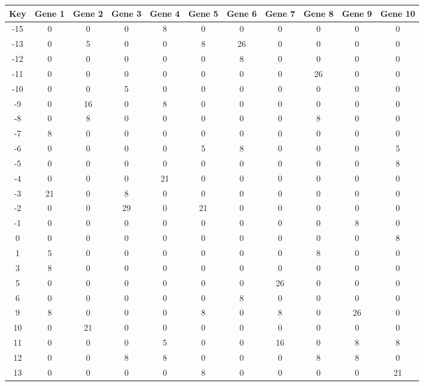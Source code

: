 \begin{tabular}{|c|c|c|c|c|c|c|c|c|c|c|}
\hline
Key & Gene 1 & Gene 2 & Gene 3 & Gene 4 & Gene 5 & Gene 6 & Gene 7 & Gene 8 & Gene 9 & Gene 10 \\
\hline
-15 & 0 & 0 & 0 & 8 & 0 & 0 & 0 & 0 & 0 & 0 \\
-13 & 0 & 5 & 0 & 0 & 8 & 26 & 0 & 0 & 0 & 0 \\
-12 & 0 & 0 & 0 & 0 & 0 & 8 & 0 & 0 & 0 & 0 \\
-11 & 0 & 0 & 0 & 0 & 0 & 0 & 0 & 26 & 0 & 0 \\
-10 & 0 & 0 & 5 & 0 & 0 & 0 & 0 & 0 & 0 & 0 \\
-9 & 0 & 16 & 0 & 8 & 0 & 0 & 0 & 0 & 0 & 0 \\
-8 & 0 & 8 & 0 & 0 & 0 & 0 & 0 & 8 & 0 & 0 \\
-7 & 8 & 0 & 0 & 0 & 0 & 0 & 0 & 0 & 0 & 0 \\
-6 & 0 & 0 & 0 & 0 & 5 & 8 & 0 & 0 & 0 & 5 \\
-5 & 0 & 0 & 0 & 0 & 0 & 0 & 0 & 0 & 0 & 8 \\
-4 & 0 & 0 & 0 & 21 & 0 & 0 & 0 & 0 & 0 & 0 \\
-3 & 21 & 0 & 8 & 0 & 0 & 0 & 0 & 0 & 0 & 0 \\
-2 & 0 & 0 & 29 & 0 & 21 & 0 & 0 & 0 & 0 & 0 \\
-1 & 0 & 0 & 0 & 0 & 0 & 0 & 0 & 0 & 8 & 0 \\
0 & 0 & 0 & 0 & 0 & 0 & 0 & 0 & 0 & 0 & 8 \\
1 & 5 & 0 & 0 & 0 & 0 & 0 & 0 & 8 & 0 & 0 \\
3 & 8 & 0 & 0 & 0 & 0 & 0 & 0 & 0 & 0 & 0 \\
5 & 0 & 0 & 0 & 0 & 0 & 0 & 26 & 0 & 0 & 0 \\
6 & 0 & 0 & 0 & 0 & 0 & 8 & 0 & 0 & 0 & 0 \\
9 & 8 & 0 & 0 & 0 & 8 & 0 & 8 & 0 & 26 & 0 \\
10 & 0 & 21 & 0 & 0 & 0 & 0 & 0 & 0 & 0 & 0 \\
11 & 0 & 0 & 0 & 5 & 0 & 0 & 16 & 0 & 8 & 8 \\
12 & 0 & 0 & 8 & 8 & 0 & 0 & 0 & 8 & 8 & 0 \\
13 & 0 & 0 & 0 & 0 & 8 & 0 & 0 & 0 & 0 & 21 \\
\hline
\end{tabular}